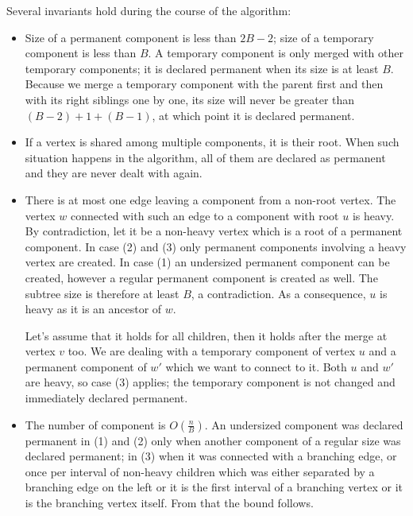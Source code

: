 Several invariants hold during the course of the algorithm:
\begin{itemize}
	\item Size of a permanent component is less than $2 B - 2$; size of a temporary component is less than $B$.
	A temporary component is only merged with other temporary components; it is declared permanent when its size is at least $B$.
	Because we merge a temporary component with the parent first and then with its right siblings one by one, its size will never be greater than $(B - 2) + 1 + (B - 1)$, at which point it is declared permanent.
	\item If a vertex is shared among multiple components, it is their root.
	When such situation happens in the algorithm, all of them are declared as permanent and they are never dealt with again.
	\item There is at most one edge leaving a component from a non-root vertex.
	The vertex $w$ connected with such an edge to a component with root $u$ is heavy.
	By contradiction, let it be a non-heavy vertex which is a root of a permanent component.
	In case (2) and (3) only permanent components involving a heavy vertex are created.
	In case (1) an undersized permanent component can be created, however a regular permanent component is created as well.
	The subtree size is therefore at least $B$, a contradiction.
	As a consequence, $u$ is heavy as it is an ancestor of $w$.
	
	Let's assume that it holds for all children, then it holds after the merge at vertex $v$ too.
	We are dealing with a temporary component of vertex $u$ and a permanent component of $w'$ which we want to connect to it.
	Both $u$ and $w'$ are heavy, so case (3) applies; the temporary component is not changed and immediately declared permanent.
	\item The number of component is $O\left(\frac{n}{B}\right)$.
	An undersized component was declared permanent in (1) and (2) only when another component of a regular size was declared permanent; in (3) when it was connected with a branching edge, or once per interval of non-heavy children which was either separated by a branching edge on the left or it is the first interval of a branching vertex or it is the branching vertex itself.
	From that the bound follows.
\end{itemize}

